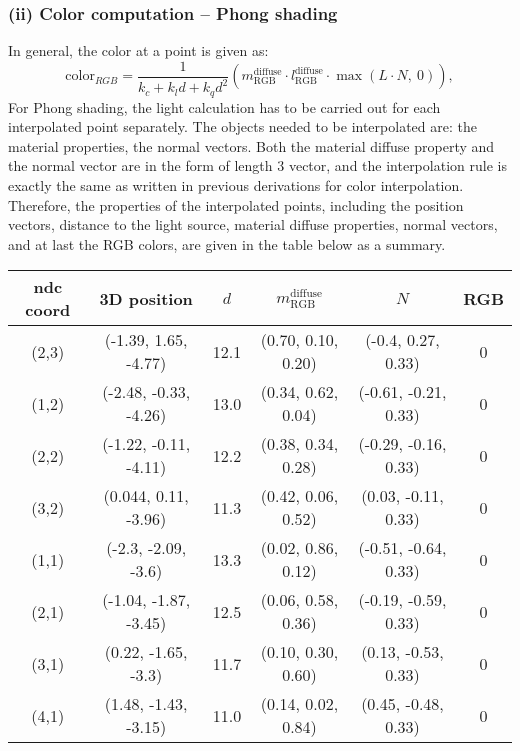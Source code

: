 \documentclass[11pt]{article}
\begin{document}
\subsubsection*{(ii) Color computation -- Phong shading}
In general, the color at a point is given as:
\begin{equation*}
    \text{color}_{RGB} = \frac{1}{k_c + k_l d + k_q d^2}(m_\text{RGB}^\text{diffuse} \cdot l_\text{RGB}^\text{diffuse} \cdot \max(L\cdot N,\ 0)),
\end{equation*}
For Phong shading, the light calculation has to be carried out for each interpolated point separately. The objects needed to be interpolated are: the material properties, the normal vectors. Both the material diffuse property and the normal vector are in the form of length 3 vector, and the interpolation rule is exactly the same as written in previous derivations for color interpolation. Therefore, the properties of the interpolated points, including the position vectors, distance to the light source, material diffuse properties, normal vectors, and at last the RGB colors, are given in the table below as a summary.  

\begin{center}
    \begin{tabular}{ c c c c c c } 
    \hline
    ndc coord & 3D position & $d$ & $m_\text{RGB}^\text{diffuse}$ & $N$ & RGB \\[4pt] 
    \hline
    (2,3) & (-1.39, 1.65, -4.77) & 12.1 & (0.70, 0.10, 0.20) & (-0.4, 0.27, 0.33) & 0 \\ 
    (1,2) & (-2.48, -0.33, -4.26) & 13.0 & (0.34, 0.62, 0.04) & (-0.61, -0.21, 0.33) & 0 \\ 
    (2,2) & (-1.22, -0.11, -4.11) & 12.2 & (0.38, 0.34, 0.28) & (-0.29, -0.16, 0.33) & 0 \\ 
    (3,2) & (0.044, 0.11, -3.96) & 11.3 & (0.42, 0.06, 0.52) & (0.03, -0.11, 0.33) & 0 \\
    (1,1) & (-2.3, -2.09, -3.6) & 13.3 & (0.02, 0.86, 0.12) & (-0.51, -0.64, 0.33) & 0 \\
    (2,1) & (-1.04, -1.87, -3.45) & 12.5 & (0.06, 0.58, 0.36) & (-0.19, -0.59, 0.33) & 0 \\
    (3,1) & (0.22, -1.65, -3.3) & 11.7 & (0.10, 0.30, 0.60) & (0.13, -0.53, 0.33) & 0 \\
    (4,1) & (1.48, -1.43, -3.15) & 11.0 & (0.14, 0.02, 0.84) & (0.45, -0.48, 0.33) & 0 \\
    \hline
    \end{tabular}
\end{center}
\end{document}
